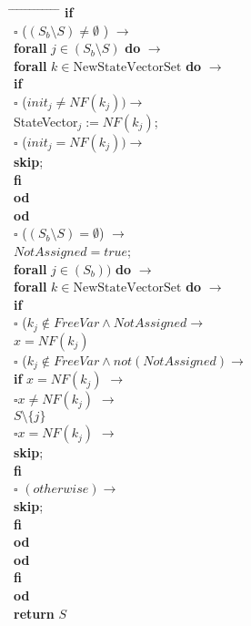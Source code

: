 \documentclass[a4paper,10pt]{article}
\theoremstyle{plain}
\theoremstyle{definition}
\newcommand{\tb}{\textbf}
\newcommand{\ra}{$\rightarrow$}
\newcommand{\sq}{$\square$}
\newcommand{\tab}{\hspace*{5.mm} \= \hspace*{5.mm} \= \hspace*{5.mm} \= \hspace*{5.mm} \= \hspace*{5.mm} \= \hspace*{5.mm}  \= \hspace*{5.mm}  \= \hspace*{5.mm}  \= \hspace*{5.mm} \= \hspace*{5.mm} \= \hspace*{5.mm}  \= \hspace*{5.mm}  \= \hspace*{5.mm}\kill}
\begin{document}
\begin{tabbing}
\tab 
\>	\tb{if}  \\
  \>	\sq	\> ($( S_{b} \setminus S) \neq \emptyset $ ) \ra \\ 
  \>	\>	\> 	\tb{forall}  $j \in ( S_b \setminus S) $ \tb{do} $\rightarrow$\\
  \>	\>	\>  	\> 	\tb{forall} $k \in \text{NewStateVectorSet}$ \tb{do} $\rightarrow$ \\
  \>	\>	\> 	\> 	\>   	\tb{if} \\
  \>	\>	\>  	\> 	\> 	\sq 	\>	($init_j \not= NF(k_j)) \rightarrow$ \\
  \>	\>	\>	\>	\>	\>	\>	\>	StateVector$_j := NF(k_j)$; \\
  \> 	\>	\>	\>	\>	\sq	\>	($init_j = NF(k_j)) \rightarrow$ \\
  \>	\>	\>	\>	\>	\>	\>	\>	\tb{skip};\\
  \>	\>	\>	\>	\>	\tb{fi}\\
  \>	\>	\>	\>	\tb{od}\\
  \> 	\>	\>	\tb{od}\\
  \>	\sq	\>  	($ (S_b \setminus S) = \emptyset $) \ra  \\
  \> 	\>	\>	$NotAssigned = true$;\\
  \>	\>	\> 	\tb{forall}  $j \in (S_b)) $ \tb{do} $\rightarrow$\\
  \>	\>	\>  	\> 	\tb{forall} $k \in \text{NewStateVectorSet}$ \tb{do} $\rightarrow$ \\
  \>	\>	\> 	\> 	\>   	\tb{if} \\
  \>	\>	\>  	\> 	\> 	\sq 	\>	($ k_j \not\in FreeVar \wedge  NotAssigned \rightarrow $\\
  \>	\>	\>	\>	\>	\>	\>	\>	$x = NF(k_j)$ \\
  \>	\>	\>  	\> 	\> 	\sq 	\>	($ k_j \not\in FreeVar \wedge  not(NotAssigned) \rightarrow $\\
  \>	\>	\>	\>	\>	\>	\>	\>	\tb{if }$x = NF(k_j)$ \ra \\
 \>	\>	\>	\>	\>	\>	\>	\>	\> 	\sq  	\>$x \neq NF(k_j)$ \ra \\
  \> 	\>	\>	\>	\>	\>	\>	\>	\>	\>	\>	$S \setminus \lbrace j \rbrace$\\
 \>	\>	\>	\>	\>	\>	\>	\>	\> 	\sq  	\>$x = NF(k_j)$ \ra \\
  \> 	\>	\>	\>	\>	\>	\>	\>	\>	\>	\>	\tb{skip}; \\
  \>	\>	\>	\>	\>	\>	\>	\>	\tb{fi} \\
  \> 	\>	\>	\>	\>	\sq	\>	$(otherwise) \rightarrow$ \\
  \> 	\>	\>	\>	\>	\>	\> \tb{skip};\\
  \>	\>	\>	\>	\>	\tb{fi}\\
  \> 	\>	\>	\>	\tb{od}\\
  \>	\>	\>	\tb{od}\\
 \>	\tb{fi}  \\

  \tb{od}\\
  \tb{return} $S$
\end{tabbing}
\end{document}
